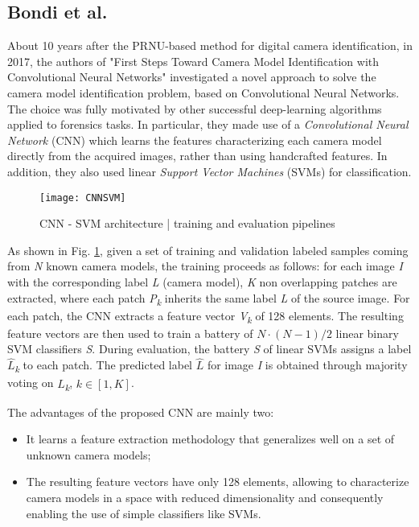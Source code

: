 \subsection{Bondi et al.}
About 10 years after the PRNU-based method for digital camera identification, in 2017, the authors of "First Steps Toward Camera Model Identification with Convolutional Neural Networks" investigated a novel approach to solve the camera model identification problem, based on Convolutional Neural Networks. The choice was fully motivated by other successful deep-learning algorithms applied to forensics tasks.
In particular, they made use of a \textit{Convolutional Neural Network} (CNN) which learns the features characterizing each camera model directly from the acquired images, rather than using handcrafted features. In addition, they also used linear \textit{Support Vector Machines} (SVMs) for classification.

\begin{figure}[ht]
	\centering
	\texttt{[image: CNNSVM]}
	\caption{CNN - SVM architecture | training and evaluation pipelines}
	\label{fig:CNNSVM}
\end{figure}

As shown in Fig. \ref{fig:CNNSVM}, given a set of training and validation labeled samples coming from \textit{N} known camera models, the training proceeds as follows:
for each image \textit{I} with the corresponding label \textit{L} (camera model), \textit{K} non overlapping patches are extracted, where each patch \textit{P\textsubscript{k}} inherits the same label \textit{L} of the source image. For each patch, the CNN extracts a feature vector \textit{V\textsubscript{k}} of 128 elements. The resulting feature vectors are then used to train a battery of $ N \cdot (N - 1)/2 $ linear binary SVM classifiers \textit{S}. 
During evaluation, the battery \textit{S} of linear SVMs assigns a label $\hat{L}$\textit{\textsubscript{k}} to each patch. The predicted label $\hat{L}$ for image \textit{I} is obtained through majority voting on $\hat{L}$\textit{\textsubscript{k}}, $k \in [1, K]$.

The advantages of the proposed CNN are mainly two:
\begin{itemize}
	\item It learns a feature extraction methodology that generalizes well on a set of unknown camera models;
	\item The resulting feature vectors have only 128 elements, allowing to characterize camera models in a space with reduced dimensionality and  consequently enabling the use of simple classifiers like SVMs.
\end{itemize}

